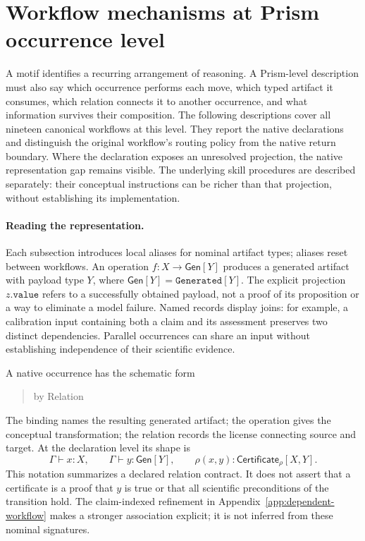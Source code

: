 %
%
%
\clearpage
\section{Workflow mechanisms at Prism occurrence level}
\label{app:granular-prism-workflows}
A motif identifies a recurring arrangement of reasoning. A Prism-level description must also say which occurrence performs each move, which typed artifact it consumes, which relation connects it to another occurrence, and what information survives their composition. The following descriptions cover all nineteen canonical workflows at this level. They report the native declarations and distinguish the original workflow's routing policy from the native return boundary. Where the declaration exposes an unresolved projection, the native representation gap remains visible. The underlying skill procedures are described separately: their conceptual instructions can be richer than that projection, without establishing its implementation.

\paragraph{Reading the representation.}
Each subsection introduces local aliases for nominal artifact types; aliases reset between workflows. An operation $f:X\to\mathsf{Gen}[Y]$ produces a generated artifact with payload type $Y$, where $\mathsf{Gen}[Y]=\mathtt{Generated}[Y]$. The explicit projection $z.\mathtt{value}$ refers to a successfully obtained payload, not a proof of its proposition or a way to eliminate a model failure. Named records display joins: for example, a calibration input containing both a claim and its assessment preserves two distinct dependencies. Parallel occurrences can share an input without establishing independence of their scientific evidence.

A native occurrence has the schematic form
\begin{quote}\small{} by Relation
\end{quote}
The binding names the resulting generated artifact; the operation gives the conceptual transformation; the relation records the license connecting source and target. At the declaration level its shape is
\[
 \Gamma\vdash x:X,\qquad\Gamma\vdash y:\mathsf{Gen}[Y],\qquad
 \rho(x,y):\mathsf{Certificate}_{\rho}[X,Y].
\]
This notation summarizes a declared relation contract. It does not assert that a certificate is a proof that $y$ is true or that all scientific preconditions of the transition hold. The claim-indexed refinement in Appendix~\ref{app:dependent-workflow} makes a stronger association explicit; it is not inferred from these nominal signatures.

